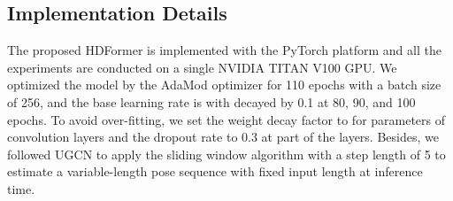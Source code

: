 \documentclass{article}
\begin{document}
\subsection{Implementation Details}
The proposed HDFormer is implemented with the PyTorch platform and all the experiments are conducted on a single NVIDIA TITAN V100 GPU. We optimized the model by the AdaMod optimizer \cite{ding2019adaptive} for 110 epochs with a batch size of 256, and the base learning rate is  with decayed by 0.1 at 80, 90, and 100 epochs. To avoid over-fitting, we set the weight decay factor to  for parameters of convolution layers and the dropout rate to 0.3 at part of the layers. Besides, we followed UGCN \cite{wang2020-motion} to apply the sliding window algorithm with a step length of 5 to estimate a variable-length pose sequence with fixed input length at inference time.
\end{document}
